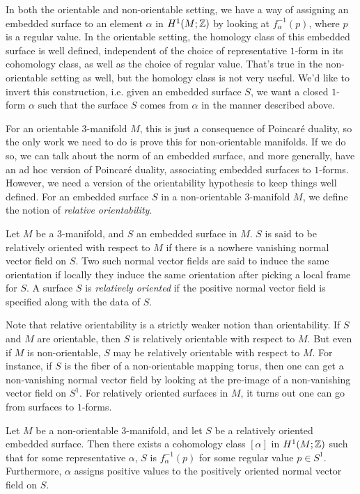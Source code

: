 In both the orientable and non-orientable setting, we have a way of assigning an embedded surface
to an element $\alpha$ in $H^1(M; \mathbb{Z})$ by looking at $f_{\alpha}^{-1}(p)$, where $p$ is a regular
value. In the orientable setting, the homology class of this embedded surface is well defined,
independent of the choice of representative $1$-form in its cohomology class, as well as the choice
of regular value. That's true in the non-orientable setting as well, but the homology class is not
very useful. We'd like to invert this construction, i.e. given an embedded surface $S$, we want a
closed $1$-form $\alpha$ such that the surface $S$ comes from $\alpha$ in the manner described
above.

For an orientable $3$-manifold $M$, this is just a consequence of Poincar\'e duality, so the only
work we need to do is prove this for non-orientable manifolds. If we do so, we can talk about the
norm of an embedded surface, and more generally, have an ad hoc version of Poincar\'e duality,
associating embedded surfaces to $1$-forms. However, we need a version of the orientability
hypothesis to keep things well defined. For an embedded surface $S$ in a non-orientable
$3$-manifold $M$, we define the notion of \emph{relative orientability}.

\begin{defn}
  Let $M$ be a $3$-manifold, and $S$ an embedded surface in $M$. $S$ is said to be relatively
  oriented with respect to $M$ if there is a nowhere vanishing normal vector field on $S$. Two
  such normal vector fields are said to induce the same orientation if locally they induce the
  same orientation after picking a local frame for $S$. A surface $S$ is \emph{relatively oriented}
  if the positive normal vector field is specified along with the data of $S$.
\end{defn}

Note that relative orientability is a strictly weaker notion than orientability. If $S$ and $M$ are
orientable, then $S$ is relatively orientable with respect to $M$. But even if $M$ is
non-orientable, $S$ may be relatively orientable with respect to $M$. For instance, if $S$ is
the fiber of a non-orientable mapping torus, then one can get a non-vanishing normal vector field
by looking at the pre-image of a non-vanishing vector field on $S^1$. For relatively oriented
surfaces in $M$, it turns out one can go from surfaces to $1$-forms.

\begin{thm}
  \label{thm:Poincare-duality}
  Let $M$ be a non-orientable $3$-manifold, and let $S$ be a relatively oriented embedded
  surface. Then there exists a cohomology class $[\alpha]$ in $H^1(M; \mathbb{Z})$ such that for some
  representative $\alpha$, $S$ is $f_{\alpha}^{-1}(p)$ for some regular value $p \in
  S^1$. Furthermore, $\alpha$ assigns positive values to the positively oriented normal vector
  field on $S$.
\end{thm}

